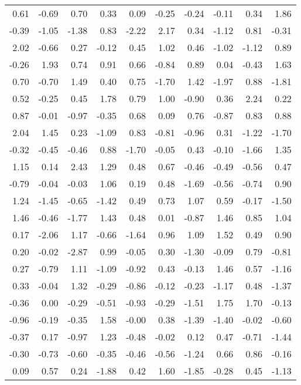 \documentclass{article}\usepackage[]{graphicx}\usepackage[]{color}
\begin{document}
\begin{longtable}{rrrrrrrrrr}
  0.61 & -0.69 & 0.70 & 0.33 & 0.09 & -0.25 & -0.24 & -0.11 & 0.34 & 1.86 \\ 
  -0.39 & -1.05 & -1.38 & 0.83 & -2.22 & 2.17 & 0.34 & -1.12 & 0.81 & -0.31 \\ 
  2.02 & -0.66 & 0.27 & -0.12 & 0.45 & 1.02 & 0.46 & -1.02 & -1.12 & 0.89 \\ 
  -0.26 & 1.93 & 0.74 & 0.91 & 0.66 & -0.84 & 0.89 & 0.04 & -0.43 & 1.63 \\ 
  0.70 & -0.70 & 1.49 & 0.40 & 0.75 & -1.70 & 1.42 & -1.97 & 0.88 & -1.81 \\ 
  0.52 & -0.25 & 0.45 & 1.78 & 0.79 & 1.00 & -0.90 & 0.36 & 2.24 & 0.22 \\ 
  0.87 & -0.01 & -0.97 & -0.35 & 0.68 & 0.09 & 0.76 & -0.87 & 0.83 & 0.88 \\ 
  2.04 & 1.45 & 0.23 & -1.09 & 0.83 & -0.81 & -0.96 & 0.31 & -1.22 & -1.70 \\ 
  -0.32 & -0.45 & -0.46 & 0.88 & -1.70 & -0.05 & 0.43 & -0.10 & -1.66 & 1.35 \\ 
  1.15 & 0.14 & 2.43 & 1.29 & 0.48 & 0.67 & -0.46 & -0.49 & -0.56 & 0.47 \\ 
  -0.79 & -0.04 & -0.03 & 1.06 & 0.19 & 0.48 & -1.69 & -0.56 & -0.74 & 0.90 \\ 
  1.24 & -1.45 & -0.65 & -1.42 & 0.49 & 0.73 & 1.07 & 0.59 & -0.17 & -1.50 \\ 
  1.46 & -0.46 & -1.77 & 1.43 & 0.48 & 0.01 & -0.87 & 1.46 & 0.85 & 1.04 \\ 
  0.17 & -2.06 & 1.17 & -0.66 & -1.64 & 0.96 & 1.09 & 1.52 & 0.49 & 0.90 \\ 
  0.20 & -0.02 & -2.87 & 0.99 & -0.05 & 0.30 & -1.30 & -0.09 & 0.79 & -0.81 \\ 
  0.27 & -0.79 & 1.11 & -1.09 & -0.92 & 0.43 & -0.13 & 1.46 & 0.57 & -1.16 \\ 
  0.33 & -0.04 & 1.32 & -0.29 & -0.86 & -0.12 & -0.23 & -1.17 & 0.48 & -1.37 \\ 
  -0.36 & 0.00 & -0.29 & -0.51 & -0.93 & -0.29 & -1.51 & 1.75 & 1.70 & -0.13 \\ 
  -0.96 & -0.19 & -0.35 & 1.58 & -0.00 & 0.38 & -1.39 & -1.40 & -0.02 & -0.60 \\ 
  -0.37 & 0.17 & -0.97 & 1.23 & -0.48 & -0.02 & 0.12 & 0.47 & -0.71 & -1.44 \\ 
  -0.30 & -0.73 & -0.60 & -0.35 & -0.46 & -0.56 & -1.24 & 0.66 & 0.86 & -0.16 \\ 
  0.09 & 0.57 & 0.24 & -1.88 & 0.42 & 1.60 & -1.85 & -0.28 & 0.45 & -1.13 \\ 

\end{longtable}
\end{document}
